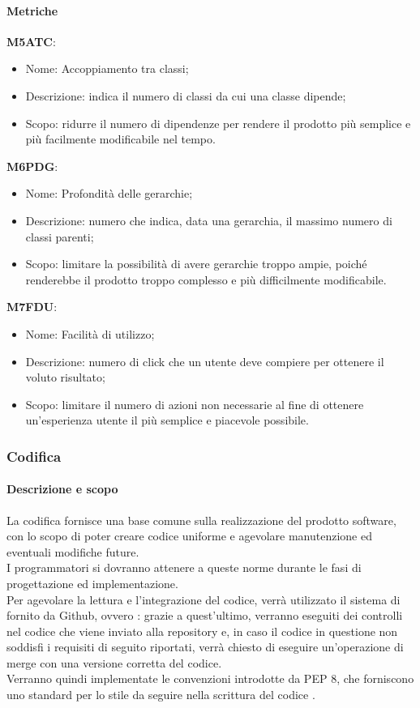 \paragraph{Metriche} \hfill \break
\textbf{M5ATC}:
\begin{itemize}
  \item Nome: Accoppiamento tra classi;
  \item Descrizione: indica il numero di classi da cui una classe dipende;
  \item Scopo: ridurre il numero di dipendenze per rendere il prodotto più semplice e più facilmente modificabile nel tempo.
\end{itemize}
\textbf{M6PDG}:
\begin{itemize}
  \item Nome: Profondità delle gerarchie;
  \item Descrizione: numero che indica, data una gerarchia, il massimo numero di classi parenti;
  \item Scopo: limitare la possibilità di avere gerarchie troppo ampie, poiché renderebbe il prodotto troppo complesso e più difficilmente modificabile.
\end{itemize}
\textbf{M7FDU}:
\begin{itemize}
  \item Nome: Facilità di utilizzo;
  \item Descrizione: numero di click che un utente deve compiere per ottenere il voluto risultato;
  \item Scopo: limitare il numero di azioni non necessarie al fine di ottenere un'esperienza utente il più semplice e piacevole possibile.
\end{itemize}

\subsubsection{Codifica} 
    \paragraph{Descrizione e scopo} \hfill \break
    La codifica fornisce una base comune sulla realizzazione del prodotto software, con lo scopo di poter creare codice uniforme e agevolare manutenzione ed eventuali modifiche future. \\
    I programmatori si dovranno attenere a queste norme durante le fasi di progettazione ed implementazione. \\
    Per agevolare la lettura e l'integrazione del codice, verrà utilizzato il sistema di  fornito da Github, ovvero : grazie a quest'ultimo, verranno
    eseguiti dei controlli nel codice che viene inviato alla repository e, in caso il codice in questione non soddisfi i requisiti di seguito riportati, verrà chiesto di eseguire un'operazione di merge con una versione corretta del codice. \\
    Verranno quindi implementate le convenzioni introdotte da PEP 8, che forniscono uno standard per lo stile da seguire nella scrittura del codice .

